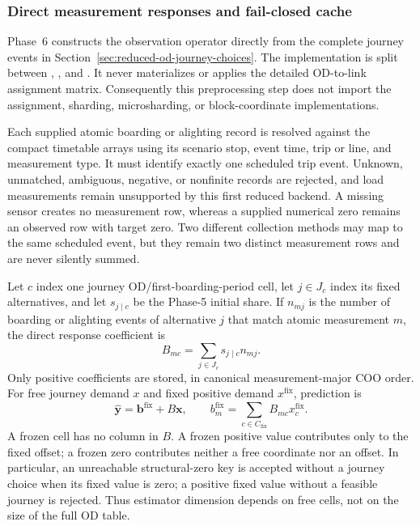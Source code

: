 \subsubsection{Direct measurement responses and fail-closed cache}
\label{sec:reduced-od-response-atoms}

Phase~6 constructs the observation operator directly from the complete journey
events in Section~\ref{sec:reduced-od-journey-choices}.  The implementation is
split between
,
, and .  It never materializes or applies
the detailed OD-to-link assignment matrix.  Consequently this preprocessing
step does not import the assignment, sharding, microsharding, or
block-coordinate implementations.

Each supplied atomic boarding or alighting record is resolved against the
compact timetable arrays using its scenario stop, event time, trip or line, and
measurement type.  It must identify exactly one scheduled trip event.  Unknown,
unmatched, ambiguous, negative, or nonfinite records are rejected, and load
measurements remain unsupported by this first reduced backend.  A missing
sensor creates no measurement row, whereas a supplied numerical zero remains
an observed row with target zero.  Two different collection methods may map to
the same scheduled event, but they remain two distinct measurement rows and are
never silently summed.

Let $c$ index one journey OD/first-boarding-period cell, let $j\in J_c$ index
its fixed alternatives, and let $s_{j\mid c}$ be the Phase-5 initial share.  If
$n_{mj}$ is the number of boarding or alighting events of alternative $j$ that
match atomic measurement $m$, the direct response coefficient is
\[
B_{mc}=\sum_{j\in J_c}s_{j\mid c}n_{mj}.
\]
Only positive coefficients are stored, in canonical measurement-major COO
order.  For free journey demand $x$ and fixed positive demand $x^{\mathrm{fix}}$,
prediction is
\[
\widehat{\bm y}
=\bm b^{\mathrm{fix}}+B\bm x,
\qquad
b^{\mathrm{fix}}_m
=\sum_{c\in C_{\mathrm{fix}}}B_{mc}x^{\mathrm{fix}}_c.
\]
A frozen cell has no column in $B$.  A frozen positive value contributes only
to the fixed offset; a frozen zero contributes neither a free coordinate nor an
offset.  In particular, an unreachable structural-zero key is accepted without
a journey choice when its fixed value is zero; a positive fixed value without a
feasible journey is rejected.  Thus estimator dimension depends on free cells,
not on the size of the full OD table.

